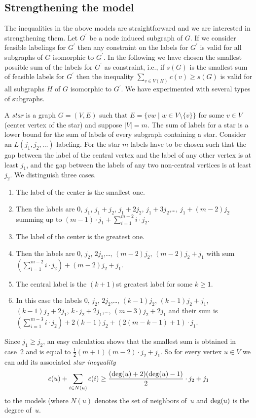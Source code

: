 \documentclass[smallextended]{svjour3}
\def\deg{\mathop{\rm deg}}
\begin{document}
\subsection{Strengthening the model}

The inequalities in the above models are straightforward and we are
interested in strengthening them. Let $G^\prime$ be a node induced subgraph of $G$.
If we consider feasible labelings for $G^\prime$ then any constraint on the
labels for $G^\prime$ is valid for all subgraphs of $G$ isomorphic to $G^\prime$.
In the following we have chosen the smallest possible sum of the labels
for $G^\prime$ as constraint, i.e., if $s(G)$ is the smallest sum of
feasible labels for $G^\prime$ then the inequality $\sum_{v\in V(H)}c(v)\geq s(G)$
is valid for all subgraphs $H$ of $G$ isomorphic to $G^\prime$.
We have experimented with several types of subgraphs.

A \emph{star} is a graph $G=(V,E)$ such that $E=\{vw\mid w\in V\setminus\{v\}\}$ for some $v\in V$
(center vertex of the star) and suppose $|V|=m$.
The sum of labels for a star is a lower bound for the sum of labels of every subgraph
containing a star. Consider an $L(j_1,j_2,\ldots)$-labeling. For the star $m$ labels have
to be chosen such that the gap between the label
of the central vertex and the label of any other vertex is at least
$j_1$, and the gap between the labels of any two non-central vertices
is at least $j_2$. We distinguish three cases.
\begin{enumerate}
\item
The label of the center is the smallest one.
\item[]Then the labels are 0, $j_1$,
$j_1+j_2$, $j_1+2j_2$, $j_1+3j_2$,\ldots , $j_1+(m-2)j_2$
summing up to $(m-1)\cdot j_1+\sum_{i=1}^{m-2}i\cdot j_2$.
\item
The label of the center is the greatest one.
\item[]Then the labels are 0, $j_2$,
$2j_2$,\ldots , $(m-2)j_2$, $(m-2)j_2+j_1$ with sum
$(\sum_{i=1}^{m-2}i\cdot j_2)+(m-2)j_2+j_1$. 
\item
The central label is the $(k+1)$st greatest label for some $k\ge1$.
\item[]In this case the labels 0, $j_2$,
$2j_2$,\ldots , $(k-1)j_2$, $(k-1)j_2+j_1$, $(k-1)j_2+2j_1$,
$k\cdot j_2+2j_1$,\ldots , $(m-3)j_2+2j_1$ and their sum is
$(\sum_{i=1}^{m-3}i\cdot j_2)+2(k-1)j_2+(2(m-k-1)+1)\cdot j_1$.
\end{enumerate}
Since $j_1\geq j_2$, an easy calculation shows that the smallest sum is obtained
in case~2 and is equal to $\frac{1}{2}(m+1)(m-2)\cdot j_2+j_1$.
So for every vertex $u\in V$ we can add its associated \emph{star inequality}
\[
c(u)+\sum_{i\in N(u)}c(i)\geq\frac{(\deg(u)+2)(\deg(u)-1)}{2}\cdot j_2+j_1
\]
to the models (where $N(u)$ denotes the set of neighbors of~$u$
and $\deg(u)$ is the degree of~$u$.
\end{document}
